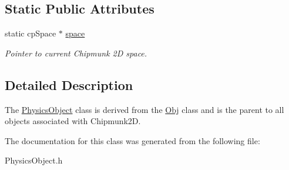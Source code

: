 \subsection*{Static Public Attributes}
\begin{DoxyCompactItemize}
\item 
static cp\+Space $\ast$ \hyperlink{class_physics_object_af51d68e507cb0a7796241695b1c78046}{space}\hypertarget{class_physics_object_af51d68e507cb0a7796241695b1c78046}{}\label{class_physics_object_af51d68e507cb0a7796241695b1c78046}

\begin{DoxyCompactList}\small\item\em Pointer to current Chipmunk 2D space. \end{DoxyCompactList}\end{DoxyCompactItemize}


\subsection{Detailed Description}
The \hyperlink{class_physics_object}{Physics\+Object} class is derived from the \hyperlink{class_obj}{Obj} class and is the parent to all objects associated with Chipmunk2D. 

The documentation for this class was generated from the following file\+:\begin{DoxyCompactItemize}
\item 
Physics\+Object.\+h\end{DoxyCompactItemize}
